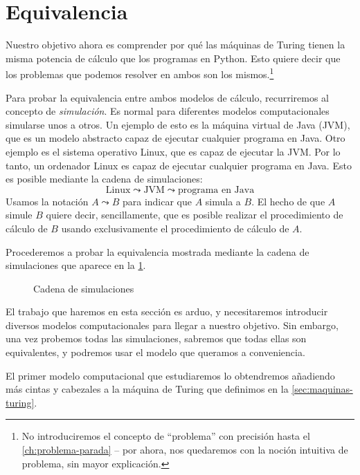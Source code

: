\section{Equivalencia}\label{sec:equivalencia}

Nuestro objetivo ahora es comprender por qué las máquinas de Turing tienen la misma potencia de cálculo que los programas en Python. Esto quiere decir que los problemas que podemos resolver en ambos son los mismos.\footnote{No introduciremos el concepto de ``problema'' con precisión hasta el \cref{ch:problema-parada} -- por ahora, nos quedaremos con la noción intuitiva de problema, sin mayor explicación.}

Para probar la equivalencia entre ambos modelos de cálculo, recurriremos al concepto de \emph{simulación}. Es normal para diferentes modelos computacionales simularse unos a otros. Un ejemplo de esto es la máquina virtual de Java (JVM), que es un modelo abstracto capaz de ejecutar cualquier programa en Java. \cite{Evans2018} Otro ejemplo es el sistema operativo Linux, que es capaz de ejecutar la JVM. Por lo tanto, un ordenador Linux es capaz de ejecutar cualquier programa en Java. Esto es posible mediante la cadena de simulaciones:
$$
    \text{Linux} \leadsto \text{JVM} \leadsto \text{programa en Java}
$$
Usamos la notación $A \leadsto B$ para indicar que $A$ simula a $B$. El hecho de que $A$ simule $B$ quiere decir, sencillamente, que es posible realizar el procedimiento de cálculo de $B$ usando exclusivamente el procedimiento de cálculo de $A$.

Procederemos a probar la equivalencia mostrada mediante la cadena de simulaciones que aparece en la \cref{fig:cadena-simulaciones}.

\begin{figure}[H]
\centering
\vspace*{8pt}

\caption{Cadena de simulaciones}
\label{fig:cadena-simulaciones}
\end{figure}

El trabajo que haremos en esta sección es arduo, y necesitaremos introducir diversos modelos computacionales para llegar a nuestro objetivo. Sin embargo, una vez probemos todas las simulaciones, sabremos que todas ellas son equivalentes, y podremos usar el modelo que queramos a conveniencia.

El primer modelo computacional que estudiaremos lo obtendremos añadiendo más cintas y cabezales a la máquina de Turing que definimos en la \cref{sec:maquinas-turing}. \cite{Sipser2012}

